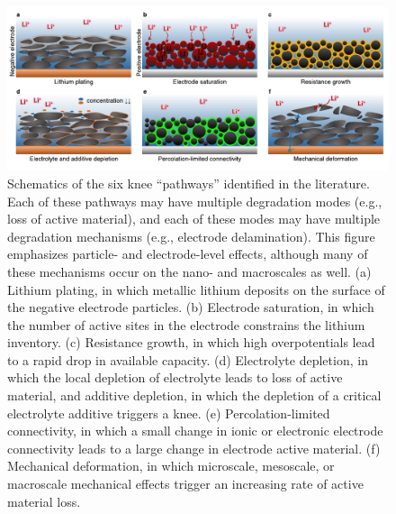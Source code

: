 \documentclass[journal=jpclcd,manuscript=article]{achemso}
\begin{document}
\begin{figure}[h!tb]
\centering
\includegraphics[scale=0.9]{final_figures/knee_pathways_v2.pdf}
\caption{Schematics of the six knee ``pathways'' identified in the literature. Each of these pathways may have multiple degradation modes (e.g., loss of active material), and each of these modes may have multiple degradation mechanisms (e.g., electrode delamination). This figure emphasizes particle- and electrode-level effects, although many of these mechanisms occur on the nano- and macroscales as well.
(a) Lithium plating, in which metallic lithium deposits on the surface of the negative electrode particles.
(b) Electrode saturation, in which the number of active sites in the electrode constrains the lithium inventory.
(c) Resistance growth, in which high overpotentials lead to a rapid drop in available capacity.
(d) Electrolyte depletion, in which the local depletion of electrolyte leads to loss of active material, and additive depletion, in which the depletion of a critical electrolyte additive triggers a knee.
(e) Percolation-limited connectivity, in which a small change in ionic or electronic electrode connectivity leads to a large change in electrode active material.
(f) Mechanical deformation, in which microscale, mesoscale, or macroscale mechanical effects trigger an increasing rate of active material loss.}
\label{fig:knee_pathways}
\end{figure}
\end{document}
